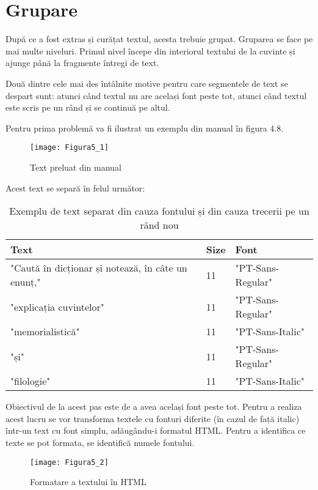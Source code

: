 \section{Grupare}

După ce a fost extras și curățat textul, acesta trebuie grupat. Gruparea se face pe mai multe niveluri. Primul nivel începe din interiorul textului de la cuvinte și ajunge până la fragmente întregi de text.

Două dintre cele mai des întâlnite motive pentru care segmentele de text se despart sunt: atunci când textul nu are același font peste tot, atunci când textul este scris pe un rând și se continuă pe altul.

\vspace{1em}
Pentru prima problemă va fi ilustrat un exemplu din manual în figura 4.8.
\begin{figure}[H]
	\centering
	\texttt{[image: Figura5\_1]}
	\caption{Text preluat din manual}
	\label{fig:Figura5_1}
\end{figure}

Acest text se separă în felul următor:
\begin{table}[H]
	\centering
	\begin{tabular}{|l|l|l|}
		\hline
		Text                                               & Size & Font              \\ \hline
		"Caută în dicționar și notează, în câte un enunț," & 11   & "PT-Sans-Regular" \\ \hline
		"explicația cuvintelor"                            & 11   & "PT-Sans-Regular" \\ \hline
		"memorialistică"                                   & 11   & "PT-Sans-Italic"  \\ \hline
		"și"                                               & 11   & "PT-Sans-Regular" \\ \hline
		"filologie"                                        & 11   & "PT-Sans-Italic"  \\ \hline
	\end{tabular}
	\caption{Exemplu de text separat din cauza fontului și din cauza trecerii pe un rând nou}
\end{table}

Obiectivul de la acest pas este de a avea același font peste tot. Pentru a realiza acest lucru se vor transforma textele cu fonturi diferite (în cazul de față italic) într-un text cu font simplu, adăugându-i formatul HTML. Pentru a identifica ce texte se pot formata, se identifică numele fontului.
\begin{figure}[H]
	\centering
	\texttt{[image: Figura5\_2]}
	\caption{Formatare a textului în HTML}
	\label{fig:Figura5_2}
\end{figure}

